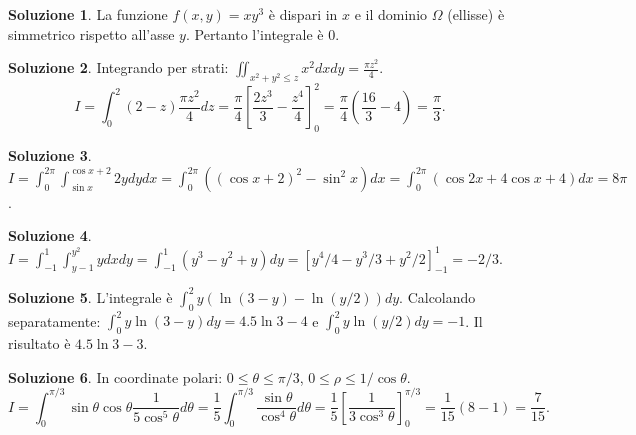 \documentclass[12pt,a4paper]{article}
\theoremstyle{definition}
\newtheorem{sol}{Soluzione}
\begin{document}
\begin{sol}
    La funzione $f(x,y) = xy^3$ è dispari in $x$ e il dominio $\Omega$ (ellisse) è simmetrico rispetto all'asse $y$. Pertanto l'integrale è 0.
\end{sol}

\begin{sol}
    Integrando per strati: $\iint_{x^2+y^2 \leq z} x^2 dx dy = \frac{\pi z^2}{4}$.
    \[ I = \int_0^2 (2-z) \frac{\pi z^2}{4} dz = \frac{\pi}{4} \left[\frac{2z^3}{3} - \frac{z^4}{4}\right]_0^2 = \frac{\pi}{4} (\frac{16}{3} - 4) = \frac{\pi}{3}. \]
\end{sol}

\begin{sol}
    $I = \int_0^{2\pi} \int_{\sin x}^{\cos x + 2} 2y dy dx = \int_0^{2\pi} ((\cos x + 2)^2 - \sin^2 x) dx = \int_0^{2\pi} (\cos 2x + 4 \cos x + 4) dx = 8\pi$.
\end{sol}

\begin{sol}
    $I = \int_{-1}^1 \int_{y-1}^{y^2} y dx dy = \int_{-1}^1 (y^3 - y^2 + y) dy = [y^4/4 - y^3/3 + y^2/2]_{-1}^1 = -2/3$.
\end{sol}

\begin{sol}
    L'integrale è $\int_0^2 y (\ln(3-y) - \ln(y/2)) dy$. Calcolando separatamente:
    $\int_0^2 y \ln(3-y) dy = 4.5\ln 3 - 4$ e $\int_0^2 y \ln(y/2) dy = -1$.
    Il risultato è $4.5\ln 3 - 3$.
\end{sol}

\begin{sol}
    In coordinate polari: $0 \leq \theta \leq \pi/3$, $0 \leq \rho \leq 1/\cos \theta$.
    \[ I = \int_0^{\pi/3} \sin \theta \cos \theta \frac{1}{5 \cos^5 \theta} d\theta = \frac{1}{5} \int_0^{\pi/3} \frac{\sin \theta}{\cos^4 \theta} d\theta = \frac{1}{5} \left[ \frac{1}{3 \cos^3 \theta} \right]_0^{\pi/3} = \frac{1}{15} (8 - 1) = \frac{7}{15}. \]

\end{sol}
\end{document}
